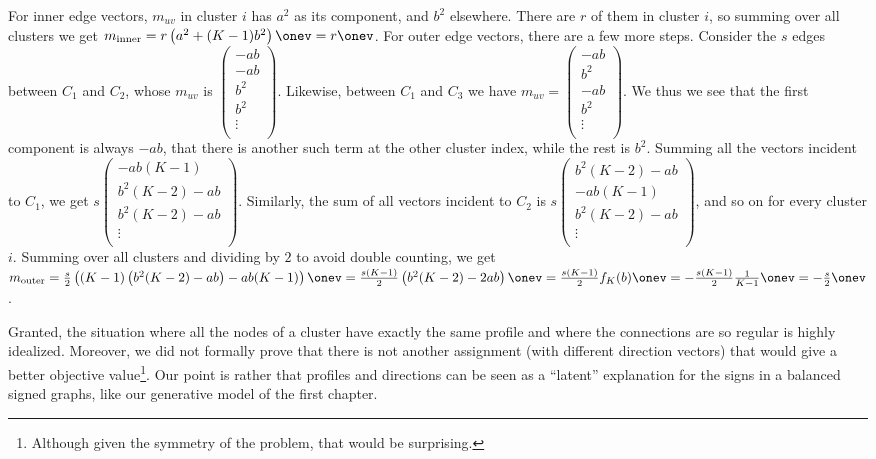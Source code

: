 \begin{aside}
For inner edge vectors, $m_{uv}$ in cluster $i$ has $a^2$ as its \ith{} component, and $b^2$
elsewhere. There are $r$ of them in cluster $i$, so summing over all clusters we get
$m_{\mathrm{inner}} = r\left(a^2 + (K-1)b^2\right)\onev = r\onev$.
For outer edge vectors, there are a few more steps. Consider the $s$ edges between $C_1$ and $C_2$,
whose $m_{uv}$ is
$\begin{pmatrix}
  -ab \\
  -ab \\
  b^2 \\
  b^2 \\
  \vdots \\  
\end{pmatrix}$. Likewise, between $C_1$ and $C_3$ we have
$m_{uv}=\begin{pmatrix}
  -ab \\
  b^2 \\
  -ab \\
  b^2 \\
  \vdots \\  
\end{pmatrix}$. We thus we see that the first component is always $-ab$, that there is another
such term at the other cluster index, while the rest is $b^2$. Summing all the vectors incident to
$C_1$, we get
$s\begin{pmatrix}
  -ab(K-1) \\
  b^2(K-2) -ab \\
  b^2(K-2) -ab \\
  \vdots \\  
\end{pmatrix}$. Similarly, the sum of all vectors incident to $C_2$ is
$s\begin{pmatrix}
  b^2(K-2) -ab \\
  -ab(K-1) \\
  b^2(K-2) -ab \\
  \vdots \\  
\end{pmatrix}$, and so on for every cluster $i$. Summing over all clusters and dividing by $2$ to
avoid double counting, we get $m_{\mathrm{outer}} = \frac{s}{2}\left( (K-1)\left(b^2(K-2) -ab\right)
-ab(K-1) \right)\onev = \frac{s(K-1)}{2}\left(b^2(K-2) -2ab\right)\onev =
\frac{s(K-1)}{2}f_K(b)\onev = -\frac{s(K-1)}{2} \frac{1}{K-1} \onev = -\frac{s}{2}\onev$.
\end{aside}

Granted, the situation where all the nodes of a cluster have exactly the same profile and where the
connections are so regular is highly idealized. Moreover, we did not formally prove that there is
not another assignment (with different direction vectors) that would give a better objective
value\footnote{Although given the symmetry of the problem, that would be surprising.}. Our point is
rather that profiles and directions can be seen as a \enquote{latent} explanation for the signs in
a balanced signed graphs, like our generative model of the first chapter.
